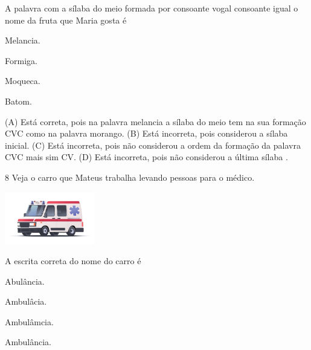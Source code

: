
A palavra com a sílaba do meio formada por consoante vogal consoante igual o nome da fruta que Maria gosta é

\begin{minipage}{.5\textwidth}
\begin{escolha}
\item Melancia.

\item Formiga.

\item Moqueca.

\item Batom.
\end{escolha}
\end{minipage}

(A) Está correta, pois na palavra melancia a sílaba do meio tem na sua
formação CVC como na palavra morango.
(B) Está incorreta, pois considerou a sílaba inicial.
(C) Está incorreta, pois não considerou a ordem da formação da palavra
CVC mais sim CV.
(D) Está incorreta, pois não considerou a última sílaba .

\num{8} Veja o carro que Mateus trabalha levando pessoas para o médico.

\includegraphics[width=1.54514in,height=0.89444in]{media/image153.jpeg}


A escrita correta do nome do carro é

\begin{minipage}{.5\textwidth}
\begin{escolha}
\item Abulância.

\item Ambulâcia.

\item Ambulâmcia.

\item Ambulância.
\end{escolha}
\end{minipage}

